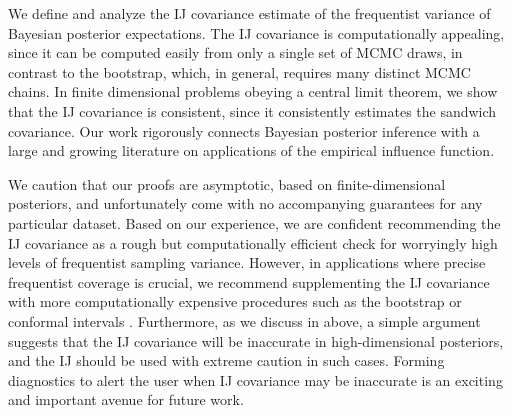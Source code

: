 We define and analyze the IJ covariance estimate of the frequentist variance of
Bayesian posterior expectations.  The IJ covariance is computationally
appealing, since it can be computed easily from only a single set of MCMC draws,
in contrast to the bootstrap, which, in general, requires many distinct MCMC
chains.  In finite dimensional problems obeying a central limit theorem, we show
that the IJ covariance is consistent, since it consistently estimates the
sandwich covariance.  Our work rigorously connects Bayesian posterior inference
with a large and growing literature on applications of the empirical influence
function.

We caution that our proofs are asymptotic, based on finite-dimensional
posteriors, and unfortunately come with no accompanying guarantees for any
particular dataset.  Based on our experience, we are confident recommending the
IJ covariance as a rough but computationally efficient check for worryingly high
levels of frequentist sampling variance. However, in applications where precise
frequentist coverage is crucial, we recommend supplementing the IJ covariance
with more computationally expensive procedures such as the bootstrap or
conformal intervals \citep{huggins:2022:bayesbag,fong:2021:conformal}.
Furthermore, as we discuss in  above, a simple argument
suggests that the IJ covariance will be inaccurate in high-dimensional
posteriors, and the IJ should be used with extreme caution in such cases.
Forming diagnostics to alert the user when IJ covariance may be inaccurate is an
exciting and important avenue for future work.